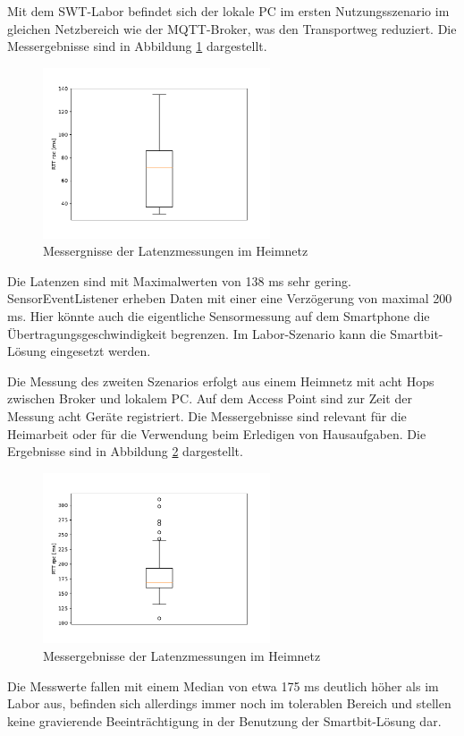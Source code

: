 \documentclass[11pt,a4paper]{report}
\begin{document}
Mit dem SWT-Labor befindet sich der lokale PC im ersten Nutzungsszenario im gleichen Netzbereich wie der MQTT-Broker, was den Transportweg reduziert.
Die Messergebnisse sind in Abbildung \ref{fig:measure_institute} dargestellt.
\begin{figure}[htbp]
  \centering
  \includegraphics[width=0.6\textwidth]{images/timing_institute.pdf}
  \caption{Messergnisse der Latenzmessungen im Heimnetz}
  \label{fig:measure_institute}
\end{figure}
Die Latenzen sind mit Maximalwerten von 138 ms sehr gering.
SensorEventListener erheben Daten mit einer eine Verzögerung von maximal 200 ms.
Hier könnte auch die eigentliche Sensormessung auf dem Smartphone die Übertragungsgeschwindigkeit begrenzen.
Im Labor-Szenario kann die Smartbit-Lösung eingesetzt werden.

Die Messung des zweiten Szenarios erfolgt aus einem Heimnetz mit acht Hops zwischen Broker und lokalem PC. 
Auf dem Access Point sind zur Zeit der Messung acht Geräte registriert.
Die Messergebnisse sind relevant für die Heimarbeit oder für die Verwendung beim Erledigen von Hausaufgaben.
Die Ergebnisse sind in Abbildung \ref{fig:measure_home} dargestellt.
\begin{figure}[htbp]
  \centering
  \includegraphics[width=0.6\textwidth]{images/timing_at_home}
  \caption{Messergebnisse der Latenzmessungen im Heimnetz}
  \label{fig:measure_home}
\end{figure}
Die Messwerte fallen mit einem Median von etwa 175 ms deutlich höher als im Labor aus, befinden sich allerdings immer noch im tolerablen Bereich und stellen keine gravierende Beeinträchtigung in der Benutzung der Smartbit-Lösung dar.
\end{document}
